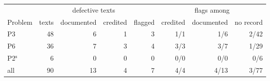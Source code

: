 \setlength{\tabcolsep}{4pt}\begin{tabular}{@{}lrrrrrrr@{}}
  \toprule
  & & \multicolumn{2}{c}{defective texts} & & \multicolumn{3}{c}{flags among} \\
  \cmidrule(lr){3-4}\cmidrule(lr){6-8}
  Problem & texts & documented & credited & flagged & credited & documented & no record \\
  \midrule
  P3 & 48 & 6 & 1 & 3 & 1/1 & 1/6 & 2/42 \\
  P6 & 36 & 7 & 3 & 4 & 3/3 & 3/7 & 1/29 \\
  P2$^{\mathrm{s}}$ & 6 & 0 & 0 & 0 & 0/0 & 0/0 & 0/6 \\
  \midrule
  all & 90 & 13 & 4 & 7 & 4/4 & 4/13 & 3/77 \\
  \bottomrule
\end{tabular}
\par\smallskip
